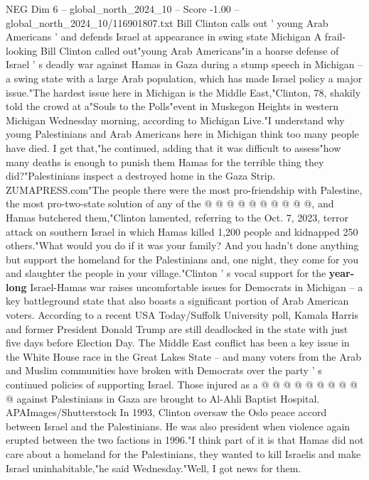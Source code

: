 \begin{textsample}{NEG Dim 6 – global\_north\_2024\_10 – Score -1.00 – global\_north\_2024\_10/116901807.txt}  \label{ex:f6_neg_081}
Bill Clinton calls out ' young Arab Americans ' and defends Israel at appearance in swing state Michigan A frail-looking Bill Clinton called out"young Arab Americans"in a hoarse defense of Israel ' s deadly war against Hamas in Gaza during a stump speech in Michigan -- a swing state with a large Arab population, which has made Israel policy a major issue."The hardest issue here in Michigan is the Middle East,"Clinton, 78, shakily told the crowd at a"Souls to the Polls"event in Muskegon Heights in western Michigan Wednesday morning, according to Michigan Live."I understand why young Palestinians and Arab Americans here in Michigan think too many people have died.
I get that,"he continued, adding that it was difficult to assess"how many deaths is enough to punish them Hamas for the terrible thing they did?"Palestinians inspect a destroyed home in the Gaza Strip.
ZUMAPRESS.com"The people there were the most pro-friendship with Palestine, the most pro-two-state solution of any of the @ @ @ @ @ @ @ @ @ @, and Hamas butchered them,"Clinton lamented, referring to the Oct. 7, 2023, terror attack on southern Israel in which Hamas killed 1,200 people and kidnapped 250 others."What would you do if it was your family?
And you hadn't done anything but support the homeland for the Palestinians and, one night, they come for you and slaughter the people in your village."Clinton ' s vocal support for the \textbf{year-long} Israel-Hamas war raises uncomfortable issues for Democrats in Michigan -- a key battleground state that also boasts a significant portion of Arab American voters.
According to a recent USA Today/Suffolk University poll, Kamala Harris and former President Donald Trump are still deadlocked in the state with just five days before Election Day.
The Middle East conflict has been a key issue in the White House race in the Great Lakes State -- and many voters from the Arab and Muslim communities have broken with Democrats over the party ' s continued policies of supporting Israel.
Those injured as a @ @ @ @ @ @ @ @ @ @ against Palestinians in Gaza are brought to Al-Ahli Baptist Hospital.
APAImages/Shutterstock In 1993, Clinton oversaw the Oslo peace accord between Israel and the Palestinians.
He was also president when violence again erupted between the two factions in 1996."I think part of it is that Hamas did not care about a homeland for the Palestinians, they wanted to kill Israelis and make Israel uninhabitable,"he said Wednesday."Well, I got news for them.

\end{textsample}
